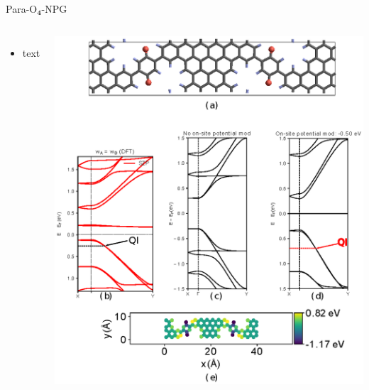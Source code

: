 \documentclass[hyperref={colorlinks=true,urlcolor=blue,linkcolor=.},aspectratio=1610,mathserif]{beamer}
\newcommand*\mathinhead[2]{\texorpdfstring{$\boldsymbol{#1}$}{#2}}
\begin{document}
\begin{frame}{Para-O\mathinhead{_4}{_4}-NPG}
\centering
\begin{columns}[c]
    \begin{itemize}
        \item text
    \end{itemize}
    \includegraphics[width=\textwidth]{Figures/fig19.eps}
\end{columns}
\end{frame}
\end{document}
